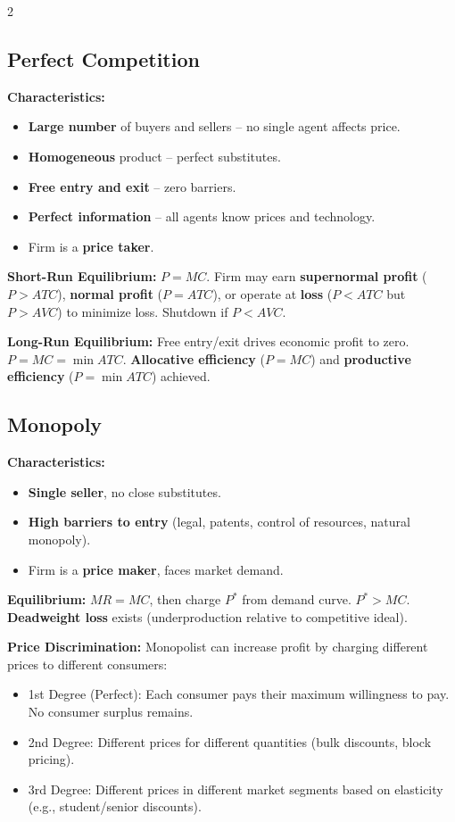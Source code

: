 \documentclass[10pt,a4paper]{article}
\begin{document}
\begin{multicols}{2}
\subsection*{Perfect Competition}
\textbf{Characteristics:}
\begin{itemize}[leftmargin=*,nosep]
    \item \textbf{Large number} of buyers and sellers -- no single agent affects price.
    \item \textbf{Homogeneous} product -- perfect substitutes.
    \item \textbf{Free entry and exit} -- zero barriers.
    \item \textbf{Perfect information} -- all agents know prices and technology.
    \item Firm is a \textbf{price taker}.
\end{itemize}

\textbf{Short-Run Equilibrium:} $P = MC$. Firm may earn \textbf{supernormal profit} ($P > ATC$), \textbf{normal profit} ($P = ATC$), or operate at \textbf{loss} ($P < ATC$ but $P > AVC$) to minimize loss. Shutdown if $P < AVC$.

\textbf{Long-Run Equilibrium:} Free entry/exit drives economic profit to zero. $P = MC = \min ATC$. \textbf{Allocative efficiency} ($P = MC$) and \textbf{productive efficiency} ($P = \min ATC$) achieved.

\subsection*{Monopoly}
\textbf{Characteristics:}
\begin{itemize}[leftmargin=*,nosep]
    \item \textbf{Single seller}, no close substitutes.
    \item \textbf{High barriers to entry} (legal, patents, control of resources, natural monopoly).
    \item Firm is a \textbf{price maker}, faces market demand.
\end{itemize}

\textbf{Equilibrium:} $MR = MC$, then charge $P^*$ from demand curve. $P^* > MC$. \textbf{Deadweight loss} exists (underproduction relative to competitive ideal).

\textbf{Price Discrimination:} Monopolist can increase profit by charging different prices to different consumers:
\begin{itemize}[nosep]
    \item 1st Degree (Perfect): Each consumer pays their maximum willingness to pay. No consumer surplus remains.
    \item 2nd Degree: Different prices for different quantities (bulk discounts, block pricing).
    \item 3rd Degree: Different prices in different market segments based on elasticity (e.g., student/senior discounts).
\end{itemize}


\end{multicols}
\end{document}
